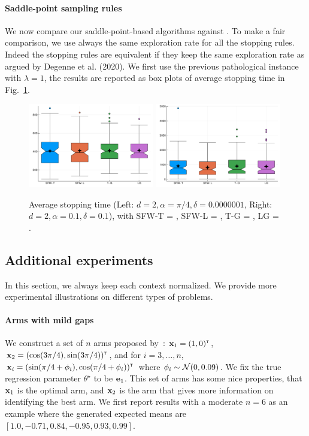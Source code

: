 \paragraph{Saddle-point sampling rules}
We now compare our saddle-point-based algorithms against \LGapE. To make a fair comparison, we use always the same exploration rate for all the stopping rules. Indeed the stopping rules are equivalent if they keep the same exploration rate as argued by Degenne et al. (2020). We first use the previous pathological instance with $\lambda=1$, the results are reported as box plots of average stopping time in Fig.~\ref{fig:exp1}.

\begin{figure}[ht]
    \centering
    \includegraphics[width=0.49\textwidth]{Chapter4/img/exp_sin_-0000001}
    \includegraphics[width=0.49\textwidth]{Chapter4/img/exp_sin_-1}
    \caption{Average stopping time (Left: $d=2,\alpha=\pi/4,\delta=0.0000001$, Right: $d=2,\alpha=0.1,\delta=0.1$), with SFW-T = \SLTCC, SFW-L = \SLGapE, T-G = \LTCC, LG = \LGapE.}
    \label{fig:exp1}
\end{figure}

\subsection{Additional experiments}

In this section, we always keep each context normalized. We provide more experimental illustrations on different types of problems.

\paragraph{Arms with mild gaps}
We construct a set of $n$ arms proposed by~\cite{fiez2019transductive}: ${\bf x}_1=(1,0)^\mathsf{\scriptscriptstyle T}$, ${\bf x}_2=(\cos(3\pi/4),\sin(3\pi/4))^\mathsf{\scriptscriptstyle T}$, and for $i = 3,\ldots,n$, ${\bf x}_i=(\sin(\pi/4+\phi_i),\cos(\pi/4+\phi_i))^\mathsf{\scriptscriptstyle T}$ where $\phi_i\sim\mathcal{N}(0,0.09)$. We fix the true regression parameter $\theta^\star$ to be ${\bf e}_1$. This set of arms has some nice properties, that ${\bf x}_1$ is the optimal arm, and ${\bf x}_2$ is the arm that gives more information on identifying the best arm. We first report results with a moderate $n=6$ as an example where the generated expected means are $[1.0, -0.71, 0.84, -0.95, 0.93, 0.99]$.

